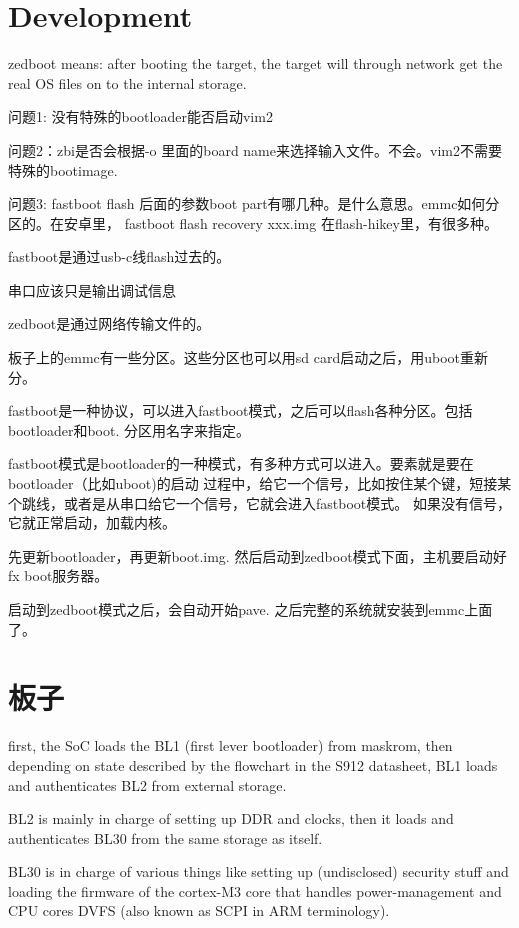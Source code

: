 \section{Development}

zedboot means: after booting the target, the target will through network get the real 
OS files on to the internal storage.

问题1: 没有特殊的bootloader能否启动vim2

问题2：zbi是否会根据-o 里面的board name来选择输入文件。不会。vim2不需要特殊的bootimage.

问题3: fastboot flash 后面的参数boot part有哪几种。是什么意思。emmc如何分区的。在安卓里，
  fastboot flash recovery xxx.img
在flash-hikey里，有很多种。


fastboot是通过usb-c线flash过去的。

串口应该只是输出调试信息

zedboot是通过网络传输文件的。

板子上的emmc有一些分区。这些分区也可以用sd card启动之后，用uboot重新分。

fastboot是一种协议，可以进入fastboot模式，之后可以flash各种分区。包括bootloader和boot. 
分区用名字来指定。

fastboot模式是bootloader的一种模式，有多种方式可以进入。要素就是要在bootloader（比如uboot)的启动
过程中，给它一个信号，比如按住某个键，短接某个跳线，或者是从串口给它一个信号，它就会进入fastboot模式。
如果没有信号，它就正常启动，加载内核。

先更新bootloader，再更新boot.img. 然后启动到zedboot模式下面，主机要启动好fx boot服务器。

启动到zedboot模式之后，会自动开始pave. 之后完整的系统就安装到emmc上面了。

\section{板子}

first, the SoC loads the BL1 (first lever bootloader) from maskrom, 
then depending on state described by the flowchart in the S912 datasheet, 
BL1 loads and authenticates BL2 from external storage.

BL2 is mainly in charge of setting up DDR and clocks, then it loads and 
authenticates BL30 from the same storage as itself.

BL30 is in charge of various things like setting up (undisclosed) security 
stuff and loading the firmware of the cortex-M3 core that handles power-management and CPU cores DVFS (also known as SCPI in ARM terminology).


